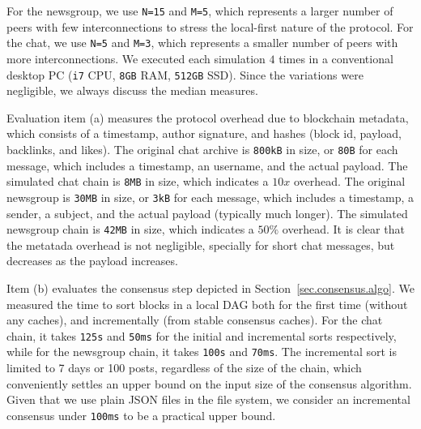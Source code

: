 \documentclass[10pt,journal,compsoc]{IEEEtran}
\newcommand{\FC}       {Freechains\xspace}
\newcommand{\code}[1]  {\texttt{\footnotesize{#1}}}
\begin{document}
For the newsgroup, we use \texttt{N=15} and \texttt{M=5}, which represents a
larger number of peers with few interconnections to stress the local-first
nature of the protocol.
For the chat, we use \texttt{N=5} and \texttt{M=3}, which represents a smaller
number of peers with more interconnections.
%
We executed each simulation $4$ times in a conventional desktop PC (\texttt{i7}
CPU, \texttt{8GB} RAM, \texttt{512GB} SSD).
Since the variations were negligible, we always discuss the median measures.

Evaluation item (a) measures the protocol overhead due to blockchain metadata,
which consists of a timestamp, author signature, and hashes (block id, payload,
backlinks, and likes).
%
The original chat archive is \texttt{800kB} in size, or \texttt{80B} for each
message, which includes a timestamp, an username, and the actual payload.
The simulated chat chain is \texttt{8MB} in size, which indicates a $10x$
overhead.
The original newsgroup is \texttt{30MB} in size, or \texttt{3kB} for each
message, which includes a timestamp, a sender, a subject, and the actual
payload (typically much longer).
The simulated newsgroup chain is \texttt{42MB} in size, which indicates a
$50\%$ overhead.
%
It is clear that the metatada overhead is not negligible, specially for short
chat messages, but decreases as the payload increases.

Item (b) evaluates the consensus step depicted in
Section~\ref{sec.consensus.algo}.
We measured the time to sort blocks in a local DAG both for the first time
(without any caches), and incrementally (from stable consensus caches).
%
For the chat chain, it takes \texttt{125s} and \texttt{50ms} for the initial
and incremental sorts respectively, while for the newsgroup chain, it takes
\texttt{100s} and \texttt{70ms}.
%
%
The incremental sort is limited to 7 days or 100 posts, regardless of the size
of the chain, which conveniently settles an upper bound on the input size of
the consensus algorithm.
%
Given that we use plain JSON files in the file system, we consider an
incremental consensus under \texttt{100ms} to be a practical upper bound.
\end{document}
